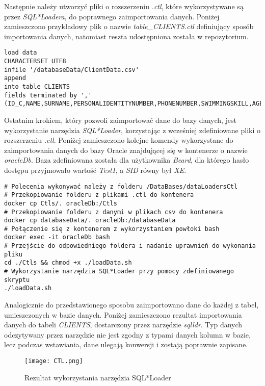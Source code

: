 \documentclass[a4paper]{article}
\begin{document}
Następnie należy utworzyć pliki o rozszerzeniu \textit{.ctl}, które wykorzystywane są przez \textit{SQL*Loadera}, \linebreak do poprawnego zaimportowania danych. Poniżej zamieszczono przykładowy plik o nazwie \linebreak \textit{table\_CLIENTS.ctl} definiujący sposób importowania danych, natomiast reszta udostępniona została w repozytorium.

\begin{verbatim}
load data 
CHARACTERSET UTF8
infile '/databaseData/ClientData.csv' 
append
into table CLIENTS
fields terminated by ','
(ID_C,NAME,SURNAME,PERSONALIDENTITYNUMBER,PHONENUMBER,SWIMMINGSKILL,AGE)
\end{verbatim}

Ostatnim krokiem, który pozwoli zaimportować dane do bazy danych, jest wykorzystanie narzędzia \textit{SQL*Loader}, korzystając z wcześniej zdefiniowane pliki o rozszerzeniu \textit{.ctl}. Poniżej zamieszczono kolejne komendy wykorzystane do zaimportowania danych do bazy Oracle znajdującej się w kontenerze o nazwie \textit{oracleDb}. Baza zdefiniowana została dla użytkownika \textit{Beard}, dla którego hasło dostępu przyjmowało wartość \textit{Test1}, a \textit{SID} równy był \textit{XE}.

\begin{verbatim}
# Polecenia wykonywać należy z folderu /DataBases/dataLoadersCtl
# Przekopiowanie folderu z plikami .ctl do kontenera
docker cp Ctls/. oracleDb:/Ctls
# Przekopiowanie folderu z danymi w plikach csv do kontenera
docker cp databaseData/. oracleDb:/databaseData
# Połączenie się z kontenerem z wykorzystaniem powłoki bash
docker exec -it oracleDb bash
# Przejście do odpowiedniego foldera i nadanie uprawnień do wykonania pliku
cd ./Ctls && chmod +x ./loadData.sh
# Wykorzystanie narzędzia SQL*Loader przy pomocy zdefiniowanego skryptu
./loadData.sh
\end{verbatim}

Analogicznie do przedstawionego sposobu zaimportowano dane do każdej z tabel, umieszczonych w bazie danych.
Poniżej zamieszczono rezultat importowania danych do tabeli \textit{CLIENTS}, dostarczony przez narzędzie \textit{sqlldr}. Typ danych odczytywany przez narzędzie nie jest zgodny z typami danych kolumn w bazie, lecz podczas wstawiania, dane ulegają konwersji i zostają poprawnie zapisane.

\newpage

\begin{figure}[h!]
\centering
\texttt{[image: CTL.png]}
\caption{Rezultat wykorzystania narzędzia SQL*Loader}
\end{figure}
\end{document}
